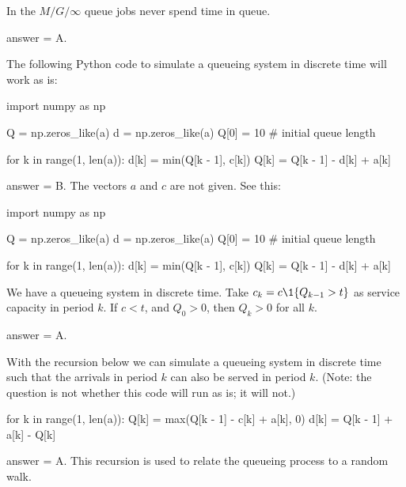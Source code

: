 \begin{exercise}[201902]
In the $M/G/\infty$ queue jobs never spend time in queue.
\begin{solution}
answer = A.
\end{solution}
\end{exercise}

\begin{exercise}[201902]
The following Python code to simulate a queueing system in discrete time will work as is: 


\begin{pyverbatim}
import numpy as np

Q = np.zeros_like(a)
d = np.zeros_like(a)
Q[0] = 10  # initial queue length

for k in range(1, len(a)):
    d[k] = min(Q[k - 1], c[k])
    Q[k] = Q[k - 1] - d[k] + a[k]

\end{pyverbatim}

\begin{solution}
  answer = B. The vectors $a$ and $c$ are not given. See this:

\begin{pyconsole}
import numpy as np

Q = np.zeros_like(a)
d = np.zeros_like(a)
Q[0] = 10  # initial queue length

for k in range(1, len(a)):
    d[k] = min(Q[k - 1], c[k])
    Q[k] = Q[k - 1] - d[k] + a[k]

\end{pyconsole}
  
\end{solution}
\end{exercise}

\begin{exercise}[201902]
  We have a queueing system in discrete time. Take $c_k = c\1{Q_{k-1} > t}$ as service capacity in period $k$. If $c < t$, and $Q_0 > 0$, then $Q_k > 0$ for all $k$. 
\begin{solution}
answer = A.
\end{solution}
\end{exercise}

\begin{exercise}[201902]
  With the recursion below we can simulate a queueing system in discrete time such that the arrivals in period $k$ can also be served in period $k$.
  (Note: the question is not whether this code will run as is; it will not.)
\begin{pyverbatim}
for k in range(1, len(a)):
    Q[k] = max(Q[k - 1] - c[k] + a[k], 0)
    d[k] = Q[k - 1] + a[k] - Q[k]

\end{pyverbatim}

\begin{solution}
answer = A. This recursion is used to relate the queueing process to a random walk.
\end{solution}
\end{exercise}


